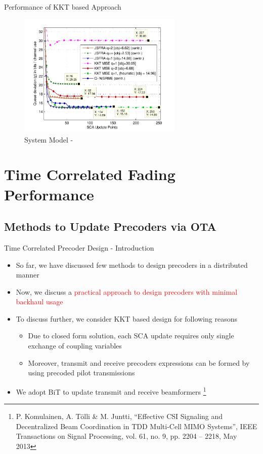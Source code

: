 \documentclass[9pt]{beamer}
\let\oldfootnote\footnote
\renewcommand\footnote[1][]{\oldfootnote[frame,#1]}
\begin{document}
\begin{frame}{Performance of KKT based Approach}
	\begin{figure}
		\centering
		\includegraphics[width=0.7\textwidth]{fig-9-3}
		\caption{System Model - }
	\end{figure}
\end{frame}

\section{Time Correlated Fading Performance}

\subsection{Methods to Update Precoders via \acs{OTA}}

\begin{frame}{Time Correlated Precoder Design - Introduction}
	\begin{itemize}
		\item So far, we have discussed few methods to design precoders in a distributed manner
		\item Now, we discuss a \textcolor{red}{practical approach to design precoders with minimal backhaul usage}
		\item To discuss further, we consider \ac{KKT} based design for following reasons
		\begin{itemize}
			\item Due to closed form solution, \textcolor[rgb]{0,0.6,0}{each \ac{SCA} update requires only single exchange of coupling variables}
			\item Moreover, transmit and receive precoders expressions can be formed by using precoded pilot transmissions
		\end{itemize}
		\item We \textcolor[rgb]{0,0,0.6}{adopt \ac{BiT}} to update transmit and receive beamformers \footnote{P. Komulainen, A. T\"olli \& M. Juntti, “Effective CSI Signaling and Decentralized Beam Coordination in TDD Multi-Cell MIMO Systems”, IEEE Transactions on Signal Processing, vol. 61, no. 9, pp. 2204 -- 2218, May 2013}
	\end{itemize}	
\end{frame}
\end{document}
